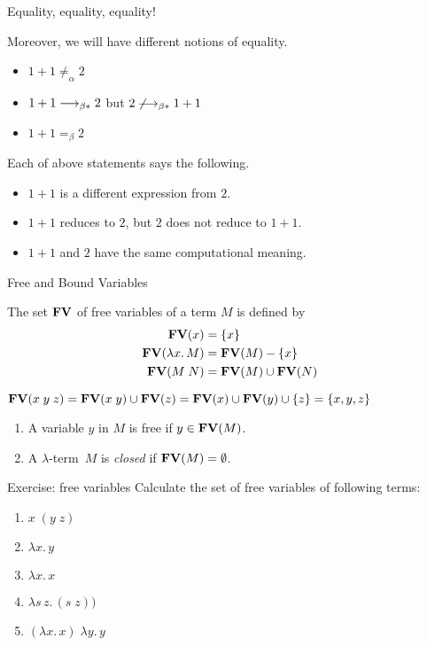 \begin{frame}{Equality, equality, equality!}

  Moreover, we will have different notions of \alert{equality}.

  \begin{itemize}
    \item $1 + 1 \neq_\alpha 2$
    \item $1 + 1 \longrightarrow_{\beta*} 2$ but $2 \not\longrightarrow_{\beta*} 1 + 1$
    \item $1 + 1 =_\beta 2$
  \end{itemize}
  Each of above statements says the following.
  \begin{itemize}
    \item $1 + 1$ is a different expression from $2$.
    \item $1 + 1$ reduces to $2$, but $2$ does not reduce to $1 + 1$.
    \item $1 + 1$ and $2$ have the same computational meaning.
  \end{itemize}
\end{frame}

\begin{frame}{Free and Bound Variables}
\begin{definition}
  The set $\mathbf{FV}$ of free variables of a term $M$ is defined by
  \begin{align*}
    \mathbf{FV}(x) & = \{x\} \\
    \mathbf{FV}(\lambda x.\, M) & = \mathbf{FV}(M) - \{x\} \\
    \mathbf{FV}(M\;N) & = \mathbf{FV}(M) \cup \mathbf{FV}(N)
  \end{align*}
\end{definition}
$\mathbf{FV}(x\;y\;z) = \mathbf{FV}(x\;y) \cup \mathbf{FV}(z) = \mathbf{FV}(x) \cup \mathbf{FV}(y) \cup \{z\} = \{x, y, z\}$
\begin{definition}
  \begin{enumerate}
    \item A variable $y$ in $M$ is \alert{free} if $y \in \mathbf{FV}(M)$.
    \item A $\lambda$-term~$M$ is \alert{\emph{closed}} if $\mathbf{FV}(M) = \emptyset$. 
  \end{enumerate}
\end{definition}

\end{frame}

\begin{frame}{Exercise: free variables}
  Calculate the set of free variables of following terms:
  \begin{enumerate}
    \item $x\;(y\; z) $
    \item $\lambda x.\, y$
    \item $\lambda x.\, x$
    \item $\lambda s\,z.\, (s \;z))$
    \item $(\lambda x.\, x)\;\lambda y.\, y$
  \end{enumerate}
\end{frame}

